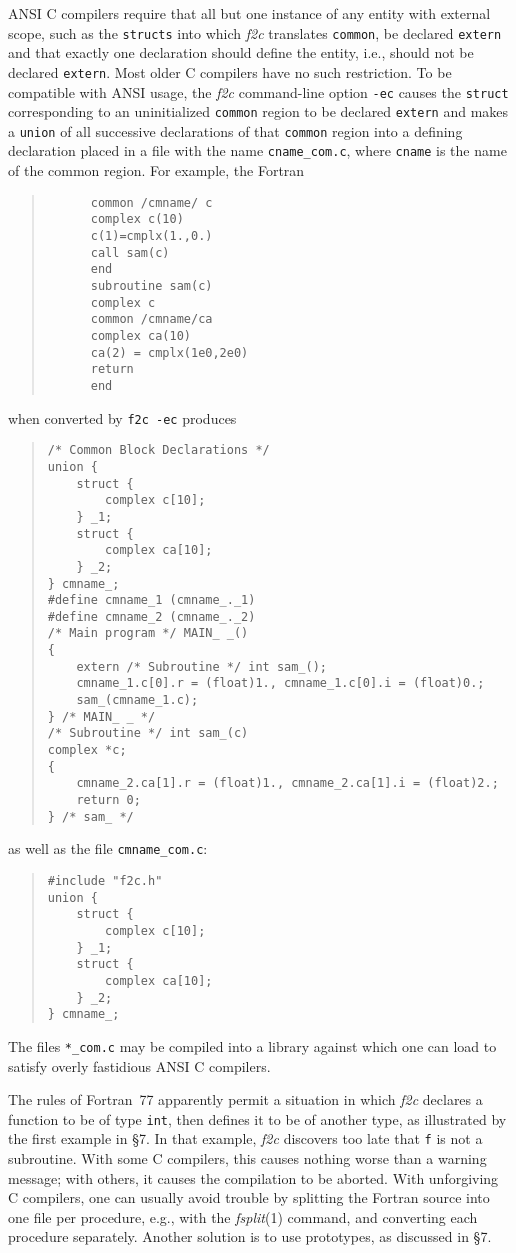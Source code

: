 \documentclass[12pt]{article}
\begin{document}
ANSI C compilers require that all but one instance of any entity with external scope, such as the \verb|structs| into which \emph{f2c} translates \verb|common|, be declared \verb|extern| and that exactly one declaration should define the entity, i.e., should not be declared \verb|extern|. Most older C compilers have no such restriction. To be compatible with ANSI usage, the \emph{f2c} command-line option \verb|-ec| causes the \verb|struct| corresponding to an uninitialized \verb|common| region to be declared \verb|extern| and makes a \verb|union| of all successive declarations of that \verb|common| region into a defining declaration placed in a file with the name \verb|cname_com.c|, where \verb|cname| is the name of the common region. For example, the Fortran
\begin{quote}
\begin{verbatim}
      common /cmname/ c
      complex c(10)
      c(1)=cmplx(1.,0.)
      call sam(c)
      end
      subroutine sam(c)
      complex c
      common /cmname/ca
      complex ca(10)
      ca(2) = cmplx(1e0,2e0)
      return
      end
\end{verbatim}
\end{quote}
when converted by \verb|f2c -ec| produces
\begin{quote}
\begin{verbatim}
/* Common Block Declarations */
union {
    struct {
        complex c[10];
    } _1;
    struct {
        complex ca[10];
    } _2;
} cmname_;
#define cmname_1 (cmname_._1)
#define cmname_2 (cmname_._2)
/* Main program */ MAIN_ _()
{
    extern /* Subroutine */ int sam_();
    cmname_1.c[0].r = (float)1., cmname_1.c[0].i = (float)0.;
    sam_(cmname_1.c);
} /* MAIN_ _ */
/* Subroutine */ int sam_(c)
complex *c;
{
    cmname_2.ca[1].r = (float)1., cmname_2.ca[1].i = (float)2.;
    return 0;
} /* sam_ */
\end{verbatim}
\end{quote}
as well as the file \verb|cmname_com.c|:
\begin{quote}
\begin{verbatim}
#include "f2c.h"
union {
    struct {
        complex c[10];
    } _1;
    struct {
        complex ca[10];
    } _2;
} cmname_;
\end{verbatim}
\end{quote}
The files \verb|*_com.c| may be compiled into a library against which one can load to satisfy overly fastidious ANSI C compilers.

The rules of Fortran~77 apparently permit a situation in which \emph{f2c} declares a function to be of type \verb|int|, then defines it to be of another type, as illustrated by the first example in §7. In that example, \emph{f2c} discovers too late that \verb|f| is not a subroutine. With some C compilers, this causes nothing worse than a warning message; with others, it causes the compilation to be aborted. With unforgiving C compilers, one can usually avoid trouble by splitting the Fortran source into one file per procedure, e.g., with the \emph{fsplit}(1) command, and converting each procedure separately. Another solution is to use prototypes, as discussed in §7.
\end{document}
